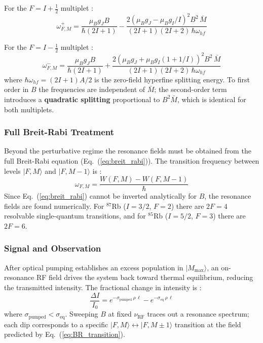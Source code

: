 For the $F = I + \tfrac{1}{2}$ multiplet :
\begin{equation}
    \omega_{F,M}^{+} = \frac{\mu_B g_J B}{\hbar(2I+1)}
    - \frac{2\left(\mu_B g_J - \mu_B g_I/I\right)^2 B^2\,\bar{M}}
           {(2I+1)(2I+2)\,\hbar\omega_{hf}}
    \label{eq:BR_plus}
\end{equation}
 
For the $F = I - \tfrac{1}{2}$ multiplet :
\begin{equation}
    \omega_{F,M}^{-} = \frac{\mu_B g_J B}{\hbar(2I+1)}
    + \frac{2\left(\mu_B g_J + \mu_B g_I(1+1/I)\right)^2 B^2\,\bar{M}}
           {(2I+1)(2I+2)\,\hbar\omega_{hf}}
    \label{eq:BR_minus}
\end{equation}
where $\hbar\omega_{hf} = (2I+1)A/2$ is the zero-field hyperfine splitting energy.
To first order in $B$ the frequencies are independent of $\bar{M}$; the second-order
term introduces a \textbf{quadratic splitting} proportional to $B^2\bar{M}$, which is
identical for both multiplets.
 
\subsubsection*{Full Breit-Rabi Treatment}
 
Beyond the perturbative regime the resonance fields must be obtained from the full
Breit-Rabi equation (Eq.~(\ref{eq:breit_rabi})). The transition frequency between levels
$|F,M\rangle$ and $|F,M-1\rangle$ is :
\begin{equation}
    \omega_{F,M} = \frac{W(F,M) - W(F,M-1)}{\hbar}
    \label{eq:BR_transition}
\end{equation}
Since Eq.~(\ref{eq:breit_rabi}) cannot be inverted analytically for $B$, the resonance
fields are found numerically. For $^{87}$Rb ($I = 3/2$, $F = 2$) there are $2F = 4$
resolvable single-quantum transitions, and for $^{85}$Rb ($I = 5/2$, $F = 3$) there
are $2F = 6$.
 
\subsubsection*{Signal and Observation}
 
After optical pumping establishes an excess population in $|M_{\max}\rangle$, an
on-resonance RF field drives the system back toward thermal equilibrium, reducing the
transmitted intensity. The fractional change in intensity is :
\begin{equation}
    \frac{\Delta I}{I_0}
    = e^{-\sigma_{\text{pumped}}\,\rho\,\ell}
    - e^{-\sigma_{\text{eq}}\,\rho\,\ell}
    \label{eq:RF_signal}
\end{equation}
where $\sigma_{\text{pumped}} < \sigma_{\text{eq}}$. Sweeping $B$ at fixed
$\nu_{\text{RF}}$ traces out a resonance spectrum; each dip corresponds to a specific
$|F,M\rangle \leftrightarrow |F,M\pm 1\rangle$ transition at the field predicted by
Eq.~(\ref{eq:BR_transition}).
 
